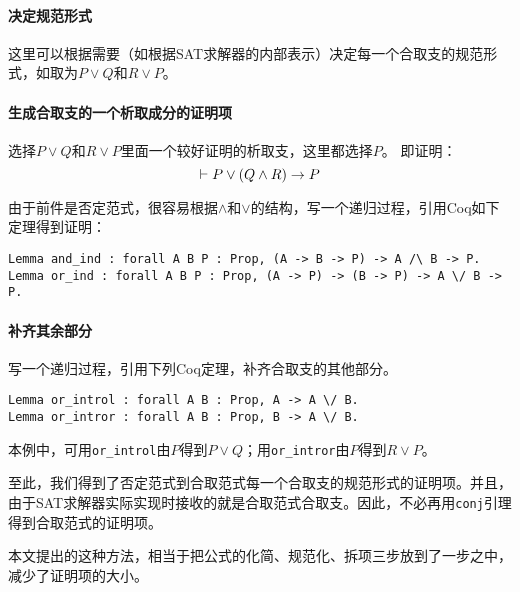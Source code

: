 \paragraph{决定规范形式}
这里可以根据需要（如根据SAT求解器的内部表示）决定每一个合取支的规范形式，如取为$P \lor Q$和$R \lor P$。

\paragraph{生成合取支的一个析取成分的证明项}
选择$P \lor Q$和$R \lor P$里面一个较好证明的析取支，这里都选择$P$。
即证明：
$$ \vdash P \lor (Q \land R) \rightarrow P $$

由于前件是否定范式，很容易根据$\land$和$\lor$的结构，写一个递归过程，引用Coq如下定理得到证明：
\begin{verbatim}
Lemma and_ind : forall A B P : Prop, (A -> B -> P) -> A /\ B -> P.
Lemma or_ind : forall A B P : Prop, (A -> P) -> (B -> P) -> A \/ B -> P.
\end{verbatim}

\paragraph{补齐其余部分}
写一个递归过程，引用下列Coq定理，补齐合取支的其他部分。
\begin{verbatim}
Lemma or_introl : forall A B : Prop, A -> A \/ B.
Lemma or_intror : forall A B : Prop, B -> A \/ B.
\end{verbatim}
本例中，可用\texttt{or\_introl}由$P$得到$P \lor Q$；用\texttt{or\_intror}由$P$得到$R \lor P$。

至此，我们得到了否定范式到合取范式每一个合取支的规范形式的证明项。并且，由于SAT求解器实际实现时接收的就是合取范式合取支。因此，不必再用\texttt{conj}引理得到合取范式的证明项。

本文提出的这种方法，相当于把公式的化简、规范化、拆项三步放到了一步之中，减少了证明项的大小。
